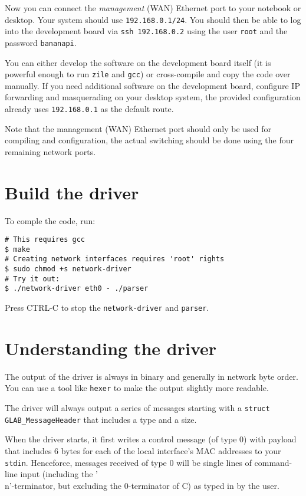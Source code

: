 \documentclass{article}
\begin{document}
Now you can connect the {\em management} (WAN) Ethernet port to your
notebook or desktop. Your system should use {\tt 192.168.0.1/24}.
You should then be able to log into the development board via
{\tt ssh 192.168.0.2} using the user {\tt root} and the password {\tt bananapi}.

You can either develop the software on the development board itself
(it is powerful enough to run {\tt zile} and {\tt gcc}) or
cross-compile and copy the code over manually.  If you need
additional software on the development board, configure IP forwarding
and masquerading on your desktop system, the provided configuration
already uses {\tt 192.168.0.1} as the default route.

Note that the management (WAN) Ethernet port should only be used
for compiling and configuration, the actual switching should be
done using the four remaining network ports.

\section{Build the driver}

To comple the code, run:
\begin{verbatim}
# This requires gcc
$ make
# Creating network interfaces requires 'root' rights
$ sudo chmod +s network-driver
# Try it out:
$ ./network-driver eth0 - ./parser
\end{verbatim}
Press CTRL-C to stop the {\tt network-driver} and {\tt parser}.



\section{Understanding the driver}

The output of the driver is always in binary and generally in network
byte order.  You can use a tool like {\tt hexer} to make the output
slightly more readable.

The driver will always output a series of messages starting with
a {\tt struct GLAB\_MessageHeader} that includes a type and a size.

When the driver starts, it first writes a control message (of type 0)
with payload that includes 6 bytes for each of the local interface's
MAC addresses to your {\tt stdin}.  Henceforce, messages received
of type 0 will be single lines of command-line input (including the
'\\n'-terminator, but excluding the 0-terminator of C) as typed in
by the user.
\end{document}
